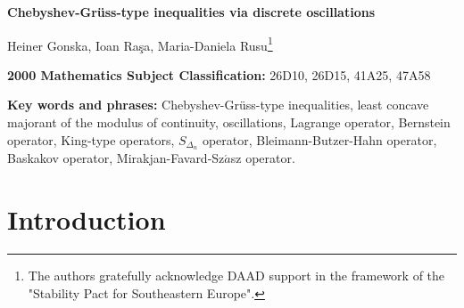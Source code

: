 \documentclass[12pt,leqno,a4paper,dvips,twoside]{article}
\begin{document}
\thispagestyle{plain} {\footnotesize {{}} \vspace*{2cm}

\begin{center}
{\Large {\bf  Chebyshev-Gr\"{u}ss-type inequalities via discrete oscillations}}
\vspace{0.5cm}

{\large Heiner Gonska, Ioan Ra\c{s}a, Maria-Daniela Rusu}\footnote{The authors gratefully acknowledge DAAD support in the framework of the "Stability Pact for Southeastern Europe".}
\end{center}
\vspace{0.5cm}


\begin{abstract}
The classical form of Gr{\"u}ss' inequality, first published by G. Gr\"{u}ss in~\cite{gruess:1935}, gives an estimate of the difference between the integral of the product and the product of the integrals of two functions. In the subsequent years, many variants of this inequality appeared in the literature. The aim of this paper is to introduce a new approach, presenting a new Chebyshev-Gr{\"u}ss-type inequality and applying it to different well-known linear, not necessarily positive, operators. Some interesting conjectures are presented. We also compare the new inequalities with some older results. This new approach gives better estimates in some cases than the ones already known. 

\end{abstract}

\begin{center}
{\bf 2000 Mathematics Subject Classification:}
26D10, %
26D15, %
41A25, %
47A58 %

{\bf Key words and phrases:}
Chebyshev-Gr\"{u}ss-type inequalities, least concave majorant of
the modulus of continuity, oscillations, Lagrange operator, Bernstein operator, King-type operators, $S_{\Delta_n}$ operator, Bleimann-Butzer-Hahn operator, Baskakov operator, Mirakjan-Favard-Sz$\acute{a}$sz operator.  
\end{center}
\vspace*{0.3cm}

\section{Introduction}

}
\end{document}
